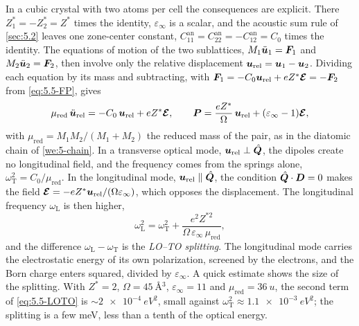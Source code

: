 In a cubic crystal with two atoms per cell the consequences are explicit. There $Z^*_1 = -Z^*_2 = Z^*$ times the identity, $\varepsilon_\infty$ is a scalar, and the acoustic sum rule of \cref{sec:5.2} leaves one zone-center constant, $C^{\mathrm{an}}_{11} = C^{\mathrm{an}}_{22} = -C^{\mathrm{an}}_{12} = C_0$ times the identity. The equations of motion of the two sublattices, $M_1\ddot{\bm{u}}_1 = \bm{F}_1$ and $M_2\ddot{\bm{u}}_2 = \bm{F}_2$, then involve only the relative displacement $\bm{u}_{\mathrm{rel}} = \bm{u}_1 - \bm{u}_2$. Dividing each equation by its mass and subtracting, with $\bm{F}_1 = -C_0\bm{u}_{\mathrm{rel}} + eZ^*\bm{\mathcal{E}} = -\bm{F}_2$ from \cref{eq:5.5-FP}, gives
\begin{equation*}
  \mu_{\mathrm{red}}\,\ddot{\bm{u}}_{\mathrm{rel}} = -C_0\,\bm{u}_{\mathrm{rel}} + eZ^*\bm{\mathcal{E}}, \qquad \bm{P} = \frac{eZ^*}{\Omega}\,\bm{u}_{\mathrm{rel}} + (\varepsilon_\infty - 1)\bm{\mathcal{E}} ,
\end{equation*}
with $\mu_{\mathrm{red}} = M_1M_2/(M_1 + M_2)$ the reduced mass of the pair, as in the diatomic chain of \cref{we:5-chain}. In a transverse optical mode, $\bm{u}_{\mathrm{rel}} \perp \hat{\bm{Q}}$, the dipoles create no longitudinal field, and the frequency comes from the springs alone, $\omega_{\mathrm{T}}^2 = C_0/\mu_{\mathrm{red}}$. In the longitudinal mode, $\bm{u}_{\mathrm{rel}} \parallel \hat{\bm{Q}}$, the condition $\hat{\bm{Q}}\cdot\bm{D} = 0$ makes the field $\bm{\mathcal{E}} = -eZ^*\bm{u}_{\mathrm{rel}}/(\Omega\varepsilon_\infty)$, which opposes the displacement. The longitudinal frequency $\omega_{\mathrm{L}}$ is then higher,
\begin{equation}
  \omega_{\mathrm{L}}^2 = \omega_{\mathrm{T}}^2 + \frac{e^2Z^{*2}}{\Omega\,\varepsilon_\infty\,\mu_{\mathrm{red}}} ,
  \label{eq:5.5-LOTO}
\end{equation}
and the difference $\omega_{\mathrm{L}} - \omega_{\mathrm{T}}$ is the \emph{LO--TO splitting}. The longitudinal mode carries the electrostatic energy of its own polarization, screened by the electrons, and the Born charge enters squared, divided by $\varepsilon_\infty$. A quick estimate shows the size of the splitting. With $Z^* = 2$, $\Omega = \SI{45}{\angstrom^3}$, $\varepsilon_\infty = 11$ and $\mu_{\mathrm{red}} = \SI{36}{u}$, the second term of \cref{eq:5.5-LOTO} is $\sim\SI{2e-4}{eV^2}$, small against $\omega_{\mathrm{T}}^2 \approx \SI{1.1e-3}{eV^2}$; the splitting is a few meV, less than a tenth of the optical energy.

